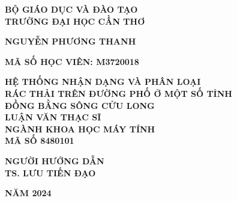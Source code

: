 \documentclass[../the.tex]{subfiles}
\begin{document}
\begin{titlepage}

\begin{center}
\thispagestyle{empty}
{\fontsize{14}{14}\selectfont \textbf{BỘ GIÁO DỤC VÀ ĐÀO TẠO}\\
\textbf{TRƯỜNG ĐẠI HỌC CẦN THƠ\\[2.5cm]}
}


{\fontsize{14}{12}\selectfont

\textbf{NGUYỄN PHƯƠNG THANH\\}

}
{\fontsize{14}{12}\selectfont

\textbf{MÃ SỐ HỌC VIÊN: M3720018\\[2.5cm]}

}

\begin{large}
\end{large}
{\fontsize{20}{12}\selectfont
\textbf{{HỆ THỐNG NHẬN DẠNG VÀ PHÂN LOẠI
 \\ RÁC THẢI TRÊN ĐƯỜNG PHỐ Ở MỘT SỐ TỈNH \\ ĐỒNG BẰNG SÔNG CỬU LONG}}}
\\[3cm]

{\fontsize{14}{14}\selectfont \textbf{LUẬN VĂN THẠC SĨ}\\
\textbf{NGÀNH KHOA HỌC MÁY TÍNH\\}
\textbf{MÃ SỐ 8480101\\[2cm]}
}

{\fontsize{13}{12}\selectfont \textbf{NGƯỜI HƯỚNG DẪN}\\
\textbf{TS. LƯU TIẾN ĐẠO\\[4cm]}
}

{\fontsize{14}{12}\selectfont
\textbf{NĂM 2024}}

\end{center}

\end{titlepage}
\end{document}
